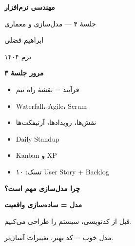 \documentclass[14pt, a4paper, landscape]{extarticle}
\newcommand{\slide}[1]{%
    \newpage
    \begin{center}
    \begin{minipage}[t]{0.95\textwidth}
    \vspace{0.5cm}
    #1
    \vspace{0.5cm}
    \end{minipage}
    \end{center}
}
\newcommand{\slidetitle}[1]{%
    \begin{center}
        {\LARGE\bfseries\textcolor{primary}{#1}}
    \end{center}
    \vspace{0.5cm}
}
\newcommand{\myaccent}[1]{\textcolor{accent}{#1}}
\begin{document}
\pagestyle{empty}


\begin{center}
    \vspace*{4cm}
    {\color{white}\Huge\bfseries مهندسی نرم‌افزار}
    
    \vspace{1cm}
    
    {\color{accent}\LARGE جلسهٔ ۴ — مدل‌سازی و معماری}
    
    \vspace{2cm}
    
    {\color{white}\Large ابراهیم فضلی}
    
    \vspace{0.5cm}
    
    {\color{white}\large ترم ۱۴۰۴}
\end{center}

\pagestyle{fancy}

\slide{
    \slidetitle{مرور جلسهٔ ۳}
    \vspace{0.5cm}
    \begin{itemize}[itemsep=0.6em]
        \item فرآیند = نقشهٔ راه تیم
        \item Waterfall، Agile، Scrum
        \item نقش‌ها، رویدادها، آرتیفکت‌ها
        \item Daily Standup
        \item Kanban و XP
        \item تسک: ۱۰ User Story + Backlog
    \end{itemize}
}

\slide{
    \slidetitle{چرا مدل‌سازی مهم است؟}
    \vspace{1cm}
    \begin{center}
        {\Large\bfseries\myaccent{مدل = ساده‌سازی واقعیت}}
        
        \vspace{1.5cm}
        
        {\large قبل از کدنویسی، سیستم را طراحی می‌کنیم.}
        
        \vspace{0.5cm}
        
        {\large مدل خوب = کد بهتر، تغییرات آسان‌تر.}
    \end{center}
}
\end{document}
